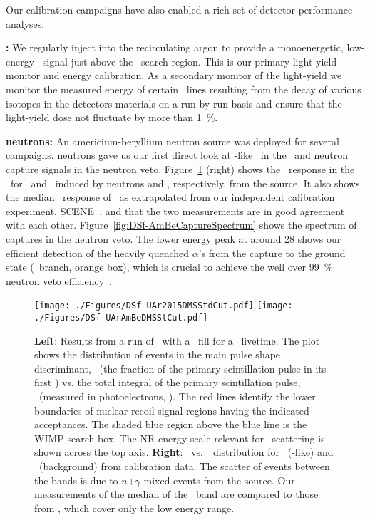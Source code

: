 Our calibration campaigns have also enabled a rich set of detector-performance analyses.

{\bf {}:} We regularly inject  into the recirculating argon to provide a monoenergetic, low-energy \ER\ signal just above the \WIMP\ search region.  This is our primary light-yield monitor and energy calibration.  As a secondary monitor of the light-yield we monitor the measured energy of certain \gr\ lines resulting from the decay of various isotopes in the detectors materials on a run-by-run basis and ensure that the light-yield dose not fluctuate by more than \SI{1}{\percent}.

{\bf {} neutrons:} An americium-beryllium neutron source was deployed for several campaigns.   neutrons gave us our first direct look at \WIMP-like \NRs\ in the \LArTPC\ and neutron capture signals in the neutron veto.  Figure~\ref{fig:DSf-UArResults} (right) shows the \FNine\ response in the \LArTPC\ for \NRs\ and \ERs\ induced by neutrons and \grs, respectively, from the  source. It also shows the median \FNine\ response of \NRs\ as extrapolated from our independent calibration experiment, SCENE~\cite{Cao:2015ks}, and that the two measurements are in good agreement with each other.  Figure~\ref{fig:DSf-AmBeCaptureSpectrum} shows the spectrum of  captures in the neutron veto.  The lower energy peak at around \SI{28}{\pe} shows our efficient detection of the heavily quenched $\alpha$'s from the capture to the  ground state (\BTenNeutronCaptureGroundDecayBR\ branch, orange box), which is crucial to achieve the well over \SI{99}{\percent} neutron veto efficiency~\cite{Agnes:2016fw}.

\begin{figure}[!t]
\begin{center}
\texttt{[image: ./Figures/DSf-UAr2015DMSStdCut.pdf]}
\texttt{[image: ./Figures/DSf-UArAmBeDMSStCut.pdf]}
\end{center}
\caption{{\bf Left}: Results from a run of \DSf\ with a \UAr\ fill for a \DSfUArLiveDay\ livetime.  The plot shows the distribution of events in the main pulse shape discriminant, \FNine\ (the fraction of the primary scintillation pulse in its first \WindowFNine) vs. the total integral of the primary scintillation pulse, \SOne\ (measured in photoelectrons, \si{\pe}).  The red lines identify the lower boundaries of nuclear-recoil signal regions having the indicated acceptances.   The shaded blue region above the blue line is the WIMP search box.  The NR energy scale relevant for \WIMP\ scattering is shown across the top axis.  {\bf Right}: \FNine\ vs.~\SOne\ distribution for \NRs\ (\WIMP-like) and \ERs\ (background) from  calibration data.  The scatter of events between the bands is due to $n$+$\gamma$ mixed events from the source.  Our measurements of the median of the \NR\ band are compared to those from \SCENE, which cover only the low energy range.}
\label{fig:DSf-UArResults}	
\end{figure}

